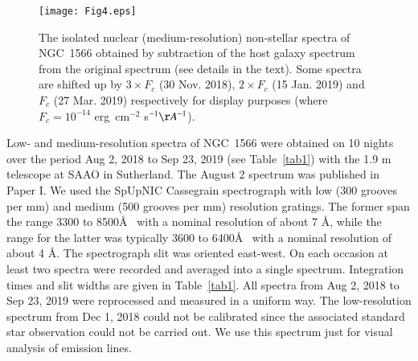 \documentclass[fleqn,usenatbib]{mnras}
\begin{document}
\begin{figure*}
	\texttt{[image: Fig4.eps]}

    \caption{The isolated nuclear (medium-resolution) non-stellar spectra of NGC~1566 obtained by subtraction of the host galaxy spectrum from the original spectrum (see details in the text).
    Some spectra are shifted up by $3\times F_c$ (30 Nov. 2018), $2\times F_c$ (15 Jan. 2019) and $F_c$ (27 Mar. 2019) respectively for display purposes (where $F_c = 10^{-14}$ erg~cm$^{-2}$ s$^{-1} \AA^{-1}$).}
    \label{fig4}
\end{figure*}


Low- and medium-resolution spectra of NGC~1566 were obtained on 10 nights over the period Aug 2, 2018 to Sep 23, 2019 (see Table~\ref{tab1}) with the 1.9 m telescope at SAAO in Sutherland. The  August 2 spectrum was published in Paper I. 
We used the SpUpNIC Cassegrain spectrograph \citep{Crause2019} with low (300 grooves per mm) and medium (500 grooves per mm) resolution gratings.  The former span the range 3300 to 8500\AA~ with a nominal resolution of about 7 \AA, while the range for the latter was typically 3600 to 6400\AA~ with a nominal resolution of about 4 \AA. The spectrograph slit was oriented east-west. On each occasion at least two spectra were recorded and averaged into a single spectrum. Integration times and slit widths are given in Table~\ref{tab1}.
 All spectra from Aug 2, 2018 to Sep 23, 2019 were reprocessed and measured in a uniform way.
The low-resolution spectrum from Dec 1, 2018 could not be calibrated since the associated standard star observation could not be carried out.  We use this spectrum just for visual analysis of emission lines.
\end{document}
